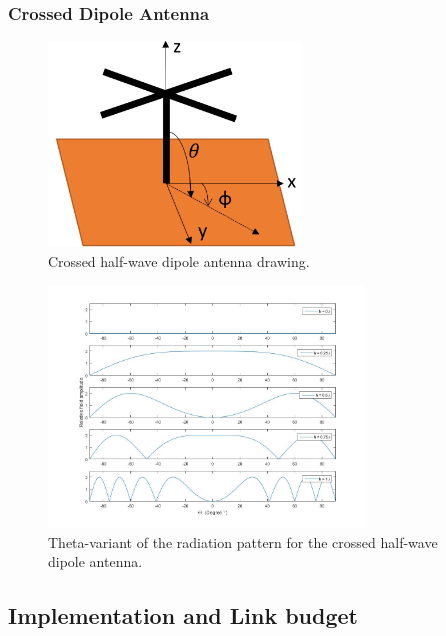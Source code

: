 \subsubsection{Crossed Dipole Antenna}
\begin{figure}[htb]
	\centering
	\includegraphics[width=0.6\textwidth]{figures/Rasmus/CrossDip}
	\caption{Crossed half-wave dipole antenna drawing.
	\label{fig:DrossDip}}
\end{figure}
\begin{figure}[htb]
	\centering
	\includegraphics[width=0.75\textwidth]{figures/Rasmus/Lopes}
	\caption{Theta-variant of the radiation pattern for the crossed half-wave dipole antenna.
	\label{fig:Lopes}}
\end{figure}
\subsection{Implementation and Link budget}

